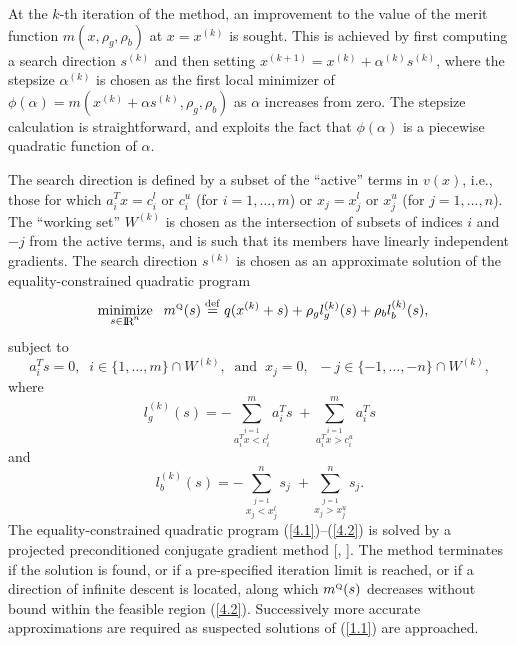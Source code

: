 \documentclass[acmtocl,acmnow]{acmtrans2m}
\newcommand{\minin}[1]{ {\renewcommand{\arraystretch}{0.8} 
                     \begin{array}[t]{c} 
                     \mbox{minimize} \vspace*{-1mm} \\ 
                     \mbox{ $\scriptstyle #1 $ } 
                     \end{array} \;} }
\newcommand{\eqdef}{\stackrel{\rm def}{=}}
\newcommand{\s}[1]{^{\mbox{\protect\tiny #1}}}
\newcommand{\tim}[1]{\;\; \mbox{#1} \;\;}
\newcommand{\req}[1]{(\ref{#1})}
\newcommand{\bciteb}[1]{\citeauthor{#1}, \citeyear{#1}}
\newcommand{\eqn}[2]{\begin{equation}\label{#1}{#2}\end{equation}}
\newcommand{\disp}[1]{\[{#1}\]}
\newcommand{\smallRe}
     {\mbox{\raisebox{-0.8pt}{\footnotesize I\hskip -1.5pt R\hskip -0.5pt}}}
\begin{document}
At the $k$-th iteration of the method, an improvement to the value
of the merit function $m(x, \rho_g, \rho_b )$ 
at $x = x^{(k)}$ is sought. This is achieved by first 
computing a search direction $s^{(k)}$
and then setting $x^{(k+1)} = x^{(k)} + \alpha^{(k)} s^{(k)}$,
where the stepsize $\alpha^{(k)}$ is chosen as the first local minimizer of 
$\phi ( \alpha ) = m( x^{(k)} + \alpha s^{(k)} , \rho_g, \rho_b )$
as $\alpha$ increases from zero. 
The stepsize calculation is straightforward, and exploits the fact that
$\phi ( \alpha )$ is a piecewise quadratic function of $\alpha$.

The search direction is defined by a subset of the ``active'' terms in 
$v(x)$, i.e., those for which 
$a_i^T x = c_i^l$ or $c_i^u$ (for $i=1,\ldots ,m$) or 
$x_j = x_j^l$ or $x_j^u$ (for $j=1,\ldots ,n$).
The ``working set'' $W^{(k)}$ is chosen as the intersection of 
subsets of indices $i$ and $-j$ from the active terms, and is such 
that its members have linearly independent gradients. 
The search direction $s^{(k)}$ is chosen as an approximate solution of 
the equality-constrained quadratic program
\eqn{4.1}{\minin{s \in \smallRe^n} 
m\s{Q}(s) \eqdef q(x^{(k)} + s) + 
 \rho_g l_g^{(k)} (s) + \rho_b l_b^{(k)} (s),}
subject to 
\eqn{4.2}{a_i^T s = 0,\;\;  i \in \{ 1, \ldots , m \} \cap W^{(k)},
\tim{and}
x_j = 0, \;\;  - j  \in \{-1, \ldots , -n \} \cap W^{(k)},}
where
\disp{l_g^{(k)} (s) = 
     - \sum_{\stackrel{i=1}{a_i^T x < c_i^l}}^m a_i^T s 
    \; + \sum_{\stackrel{i=1}{a_i^T x > c_i^u}}^m a_i^T s}
and
\disp{l_b^{(k)} (s) = 
    - \sum_{\stackrel{j=1}{x_j < x_j^l}}^n s_j
    \; + \sum_{\stackrel{j=1}{x_j > x_j^u}}^n s_j .}
The equality-constrained quadratic program \req{4.1}--\req{4.2} is solved by
a projected preconditioned conjugate gradient 
method [\bciteb{GoulHribNoce98}]. The method terminates
if the solution is found, or if a pre-specified iteration limit is reached,
or if a direction of infinite descent is located, along which $m\s{Q}(s)$
decreases without bound within the feasible region \req{4.2}.
Successively more accurate approximations are required as suspected 
solutions of \req{1.1} are approached.
\end{document}
